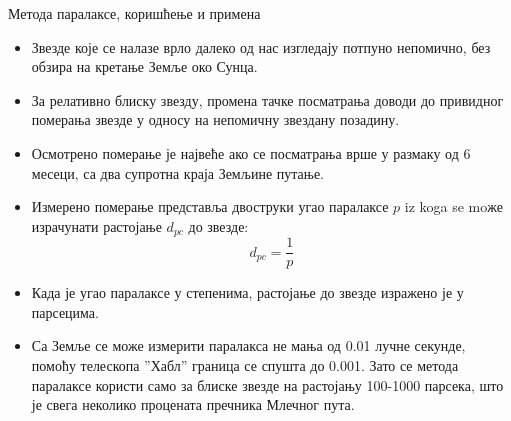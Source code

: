 \documentclass[aspectratio=169, xcolor=table, 10pt]{beamer}
\begin{document}
\begin{frame}{Метода паралаксе, коришћење и примена}
  \begin{itemize}
    \item Звезде које се налазе врло далеко од нас изгледају потпуно непомично, без обзира на кретање Земље око Сунца.
    \item За релативно блиску звезду, промена тачке посматрања доводи до привидног померања звезде у односу на непомичну звездану позадину\cite{dina}.
    \item Осмотрено померање је највеће ако се посматрања врше у размаку од 6 месеци, са два супротна краја Земљине путање.
    \item Измерено померање представља двоструки угао паралаксе $p$ iz koga se moже израчунати растојање $d_{pc}$ до звезде:
      \begin{equation*}
        d_{pc}=\frac{1}{p}
      \end{equation*}
    \item Када је угао паралаксе у степенима, растојање до звезде изражено је у парсецима.
    \item Са Земље се може измерити паралакса не мања од 0.01 лучне секунде, помоћу телескопа ”Хабл” граница се спушта до 0.001. Зато се метода паралаксе користи само за блиске звезде на растојању 100-1000 парсека, што је свега неколико процената пречника Млечног пута.
  \end{itemize}
\end{frame}
\end{document}
